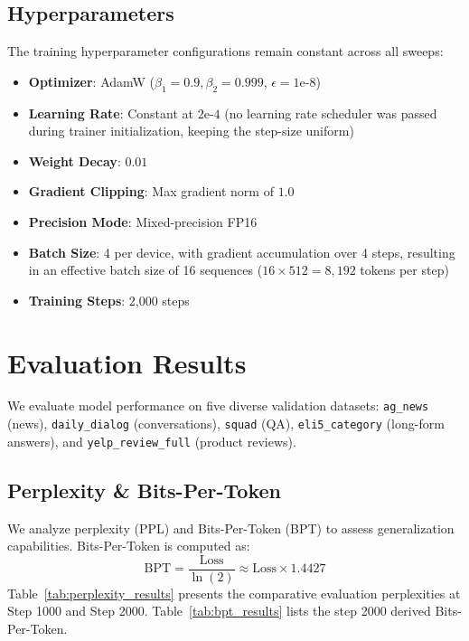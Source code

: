 \documentclass[11pt,a4paper]{article}
\begin{document}
\subsection{Hyperparameters}
The training hyperparameter configurations remain constant across all sweeps:
\begin{itemize}
    \item \textbf{Optimizer}: AdamW ($\beta_1 = 0.9, \beta_2 = 0.999$, $\epsilon = 1\text{e-}8$)
    \item \textbf{Learning Rate}: Constant at $2\text{e-}4$ (no learning rate scheduler was passed during trainer initialization, keeping the step-size uniform)
    \item \textbf{Weight Decay}: $0.01$
    \item \textbf{Gradient Clipping}: Max gradient norm of $1.0$
    \item \textbf{Precision Mode}: Mixed-precision FP16
    \item \textbf{Batch Size}: 4 per device, with gradient accumulation over 4 steps, resulting in an effective batch size of 16 sequences ($16 \times 512 = 8,192$ tokens per step)
    \item \textbf{Training Steps}: 2,000 steps
\end{itemize}

\section{Evaluation Results}
We evaluate model performance on five diverse validation datasets: \texttt{ag\_news} (news), \texttt{daily\_dialog} (conversations), \texttt{squad} (QA), \texttt{eli5\_category} (long-form answers), and \texttt{yelp\_review\_full} (product reviews).

\subsection{Perplexity \& Bits-Per-Token}
We analyze perplexity (PPL) and Bits-Per-Token (BPT) to assess generalization capabilities. Bits-Per-Token is computed as:
\begin{equation}
\text{BPT} = \frac{\text{Loss}}{\ln(2)} \approx \text{Loss} \times 1.4427
\end{equation}
Table~\ref{tab:perplexity_results} presents the comparative evaluation perplexities at Step 1000 and Step 2000. Table~\ref{tab:bpt_results} lists the step 2000 derived Bits-Per-Token.
\end{document}
